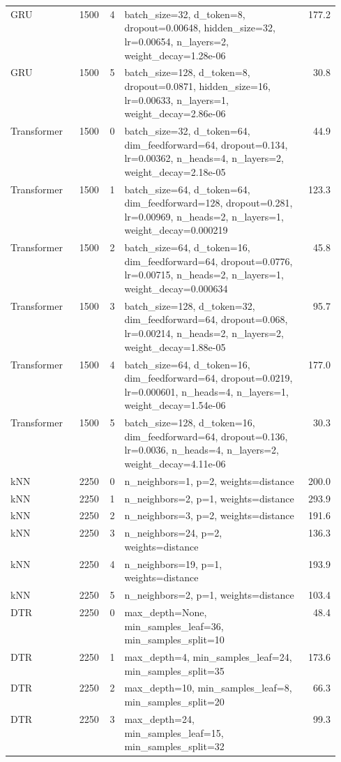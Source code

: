 \begin{longtable}{lrrp{0.55\linewidth}r}
GRU & 1500 & 4 & batch\_size=32, d\_token=8, dropout=0.00648, hidden\_size=32, lr=0.00654, n\_layers=2, weight\_decay=1.28e-06 & 177.2 \\
GRU & 1500 & 5 & batch\_size=128, d\_token=8, dropout=0.0871, hidden\_size=16, lr=0.00633, n\_layers=1, weight\_decay=2.86e-06 & 30.8 \\
Transformer & 1500 & 0 & batch\_size=32, d\_token=64, dim\_feedforward=64, dropout=0.134, lr=0.00362, n\_heads=4, n\_layers=2, weight\_decay=2.18e-05 & 44.9 \\
Transformer & 1500 & 1 & batch\_size=64, d\_token=64, dim\_feedforward=128, dropout=0.281, lr=0.00969, n\_heads=2, n\_layers=1, weight\_decay=0.000219 & 123.3 \\
Transformer & 1500 & 2 & batch\_size=64, d\_token=16, dim\_feedforward=64, dropout=0.0776, lr=0.00715, n\_heads=2, n\_layers=1, weight\_decay=0.000634 & 45.8 \\
Transformer & 1500 & 3 & batch\_size=128, d\_token=32, dim\_feedforward=64, dropout=0.068, lr=0.00214, n\_heads=2, n\_layers=2, weight\_decay=1.88e-05 & 95.7 \\
Transformer & 1500 & 4 & batch\_size=64, d\_token=16, dim\_feedforward=64, dropout=0.0219, lr=0.000601, n\_heads=4, n\_layers=1, weight\_decay=1.54e-06 & 177.0 \\
Transformer & 1500 & 5 & batch\_size=128, d\_token=16, dim\_feedforward=64, dropout=0.136, lr=0.0036, n\_heads=4, n\_layers=2, weight\_decay=4.11e-06 & 30.3 \\
\midrule
kNN & 2250 & 0 & n\_neighbors=1, p=2, weights=distance & 200.0 \\
kNN & 2250 & 1 & n\_neighbors=2, p=1, weights=distance & 293.9 \\
kNN & 2250 & 2 & n\_neighbors=3, p=2, weights=distance & 191.6 \\
kNN & 2250 & 3 & n\_neighbors=24, p=2, weights=distance & 136.3 \\
kNN & 2250 & 4 & n\_neighbors=19, p=1, weights=distance & 193.9 \\
kNN & 2250 & 5 & n\_neighbors=2, p=1, weights=distance & 103.4 \\
DTR & 2250 & 0 & max\_depth=None, min\_samples\_leaf=36, min\_samples\_split=10 & 48.4 \\
DTR & 2250 & 1 & max\_depth=4, min\_samples\_leaf=24, min\_samples\_split=35 & 173.6 \\
DTR & 2250 & 2 & max\_depth=10, min\_samples\_leaf=8, min\_samples\_split=20 & 66.3 \\
DTR & 2250 & 3 & max\_depth=24, min\_samples\_leaf=15, min\_samples\_split=32 & 99.3 \\

\end{longtable}
